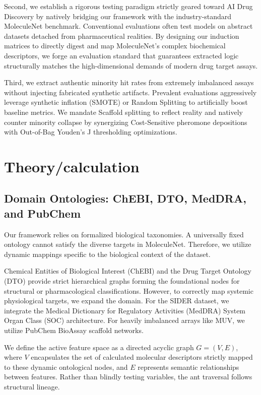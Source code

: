 \documentclass[preprint,12pt,authoryear]{elsarticle}
\begin{document}
Second, we establish a rigorous testing paradigm strictly geared toward AI Drug Discovery by natively bridging our framework with the industry-standard MoleculeNet benchmark. Conventional evaluations often test models on abstract datasets detached from pharmaceutical realities. By designing our induction matrices to directly digest and map MoleculeNet's complex biochemical descriptors, we forge an evaluation standard that guarantees extracted logic structurally matches the high-dimensional demands of modern drug target assays.

Third, we extract authentic minority hit rates from extremely imbalanced assays without injecting fabricated synthetic artifacts. Prevalent evaluations aggressively leverage synthetic inflation (SMOTE) or Random Splitting to artificially boost baseline metrics. We mandate Scaffold splitting to reflect reality and natively counter minority collapse by synergizing Cost-Sensitive pheromone depositions with Out-of-Bag Youden's J thresholding optimizations.

\section{Theory/calculation}
\label{sec:theory}

\subsection{Domain Ontologies: ChEBI, DTO, MedDRA, and PubChem}
Our framework relies on formalized biological taxonomies. A universally fixed ontology cannot satisfy the diverse targets in MoleculeNet. Therefore, we utilize dynamic mappings specific to the biological context of the dataset.

Chemical Entities of Biological Interest (ChEBI) and the Drug Target Ontology (DTO) provide strict hierarchical graphs forming the foundational nodes for structural or pharmacological classifications. However, to correctly map systemic physiological targets, we expand the domain. For the SIDER dataset, we integrate the Medical Dictionary for Regulatory Activities (MedDRA) System Organ Class (SOC) architecture. For heavily imbalanced arrays like MUV, we utilize PubChem BioAssay scaffold networks.

We define the active feature space as a directed acyclic graph $G = (V, E)$, where $V$ encapsulates the set of calculated molecular descriptors strictly mapped to these dynamic ontological nodes, and $E$ represents semantic relationships between features. Rather than blindly testing variables, the ant traversal follows structural lineage.
\end{document}
